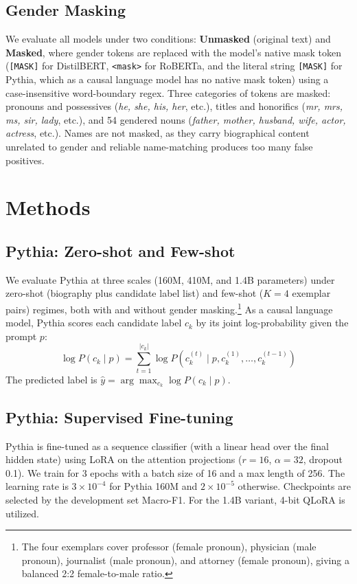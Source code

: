 \documentclass[11pt]{article}
\begin{document}
\subsection{Gender Masking}
We evaluate all models under two conditions: \textbf{Unmasked}
(original text) and \textbf{Masked}, where gender tokens are replaced
with the model's native mask token (\texttt{[MASK]} for DistilBERT,
\texttt{<mask>} for RoBERTa, and the literal string \texttt{[MASK]}
for Pythia, which as a causal language model has no native mask token)
using a case-insensitive word-boundary regex. Three categories of tokens are masked: pronouns and possessives
(\emph{he, she, his, her}, etc.), titles and honorifics (\emph{mr,
mrs, ms, sir, lady}, etc.), and 54 gendered nouns (\emph{father,
mother, husband, wife, actor, actress}, etc.). Names are not masked, as they carry biographical content unrelated
to gender and reliable name-matching produces too many false positives.

\section{Methods}

\subsection{Pythia: Zero-shot and Few-shot}
We evaluate Pythia \citep{biderman2023pythia} at three scales (160M,
410M, and 1.4B parameters) under zero-shot (biography plus candidate
label list) and few-shot ($K\!=\!4$ exemplar pairs) regimes, both with
and without gender masking.\footnote{The four exemplars cover professor (female pronoun), physician (male pronoun), journalist (male pronoun), and attorney (female pronoun), giving a balanced 2:2 female-to-male ratio.}
As a causal language model, Pythia scores each candidate label $c_k$
by its joint log-probability given the prompt $p$:
\begin{equation} \log P(c_k \mid p) = \sum_{t=1}^{|c_k|} \log P\!\left(c_k^{(t)} \mid p, c_k^{(1)}, \ldots, c_k^{(t-1)}\right) \end{equation}
The predicted label is $\hat{y} = \arg\max_{c_k} \log P(c_k \mid p)$.

\subsection{Pythia: Supervised Fine-tuning}
Pythia is fine-tuned as a sequence classifier (with a linear head over the final hidden state) using LoRA \citep{hu2022lora} on the attention projections ($r=16$, $\alpha=32$, dropout 0.1). We train for 3 epochs with a batch size of 16 and a max length of 256. The learning rate is $3 \times 10^{-4}$ for Pythia 160M and $2 \times 10^{-5}$ otherwise. Checkpoints are selected by the development set Macro-F1. For the 1.4B variant, 4-bit QLoRA is utilized.
\end{document}
